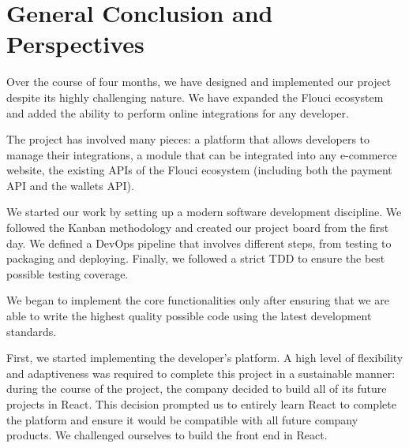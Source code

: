 \chapter{General Conclusion and Perspectives }
\pagestyle{fancy}
\fancyhf{}
\fancyhead[R]{\bfseries\rightmark}
\fancyfoot[R]{\thepage}
\renewcommand{\headrulewidth}{0.5pt}
\renewcommand{\footrulewidth}{0pt}
\renewcommand{\chaptermark}[1]{\markboth{\MakeUppercase{\chaptername~\thechapter. #1 }}{}}
\renewcommand{\sectionmark}[1]{\markright{\thechapter.\thesection~ #1}}

\begin{spacing}{1.2}


\hspace{\parindent} Over the course of four months, we have designed and implemented our  project despite its highly challenging nature. We have expanded the Flouci ecosystem and added the ability to perform online integrations for any developer.
\newline

The project has involved many pieces: a platform that allows developers to manage their integrations, a module that can be integrated into any e-commerce website, the existing APIs of the Flouci ecosystem (including both the payment API and the wallets API).   
\newline

We started our work by setting up a modern software development discipline. We followed the Kanban methodology and created our project board from the first day. We defined a DevOps pipeline that involves different steps, from testing to packaging and deploying. Finally, we followed a strict TDD to ensure the best possible testing coverage. 
\newline

We began to implement the core functionalities only after ensuring that we are able to write the highest quality possible code using the latest development standards. 
\newline

First, we started implementing the developer's platform. A high level of flexibility and adaptiveness was required to complete this project in a sustainable manner: during the course of the project, the company decided to build all of its future projects in React. This decision prompted us to entirely learn React to complete the platform and ensure it would be compatible with all future company products. We challenged ourselves to build the front end in React.
\newline


\end{spacing}

